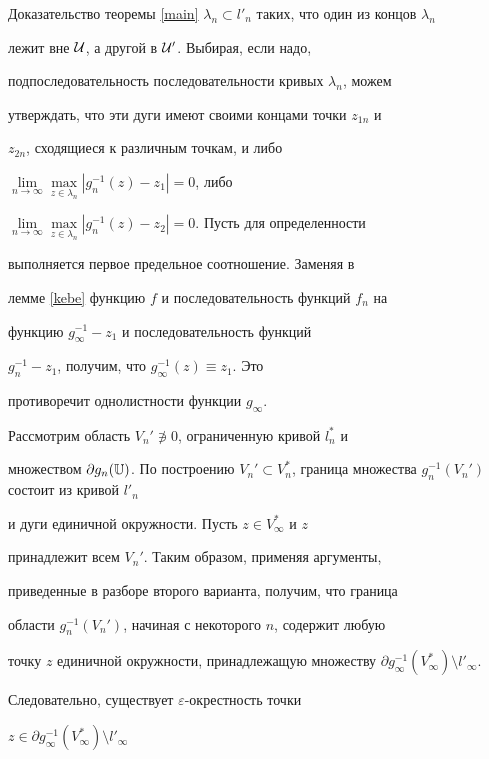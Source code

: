\begin{pf*}{Доказательство теоремы \ref{main}}
$\lambda_n\subset l'_n$ таких, что один из концов $\lambda_n$


лежит вне $\cal U$, а другой в $\cal U'$. Выбирая, если надо,


подпоследовательность последовательности кривых $\lambda_n$, можем


утверждать, что эти дуги имеют своими концами точки $z_{1n}$ и


$z_{2n}$, сходящиеся к различным точкам, и либо


$\lim\limits_{n\to\infty}\max\limits_{z\in


\lambda_n}|g_n^{-1}(z)-z_1|=0$, либо


$\lim\limits_{n\to\infty}\max\limits_{z\in


\lambda_n}|g_n^{-1}(z)-z_2|=0$. Пусть для определенности


выполняется первое предельное соотношение. Заменяя в


лемме \ref{kebe} функцию $f$ и последовательность функций $f_n$ на


функцию $g^{-1}_\infty-z_1$ и последовательность функций


$g^{-1}_n-z_1$, получим, что $g^{-1}_\infty(z)\equiv z_1$. Это


противоречит однолистности функции $g_\infty$.





Рассмотрим область $V_n'\not\ni0$, ограниченную кривой $l_n^*$ и


множеством $\partial g_n(\Bbb U)$. По построению $V_n'\subset


V_n^*$, граница множества $g_n^{-1}(V_n')$ состоит из кривой $l'_n$


и дуги единичной окружности. Пусть $z\in V_\infty^*$ и $z$


принадлежит всем $V_n'$. Таким образом, применяя аргументы,


приведенные в разборе второго варианта, получим, что граница


области $g_n^{-1}(V_n')$, начиная с некоторого $n$, содержит любую


точку $z$ единичной окружности, принадлежащую множеству $\partial


g^{-1}_\infty(V^*_\infty)\setminus l'_\infty$.





Следовательно, существует $\varepsilon$-окрестность точки


$z\in\partial g^{-1}_\infty(V^*_\infty)\setminus l'_\infty$



\end{pf*}
